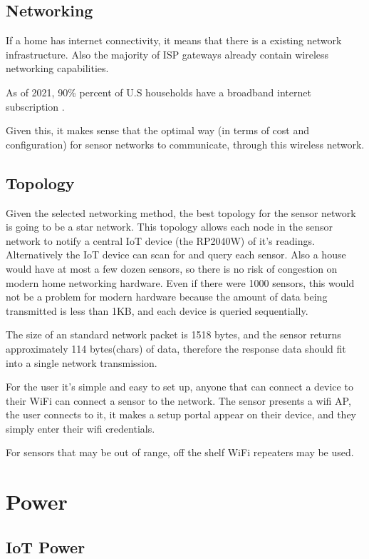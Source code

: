 \documentclass[10pt, journal]{IEEEtran} %
\begin{document}
\subsection{Networking}

If a home has internet connectivity, it means that there is a existing network infrastructure.
Also the majority of ISP gateways already contain wireless networking capabilities.

As of 2021, 90\% percent of U.S households have a broadband internet subscription \cite{censusgov}.

Given this, it makes sense that the optimal way (in terms of cost and configuration) for sensor networks to communicate,
through this wireless network.

\subsection{Topology}

Given the selected networking method, the best topology for the sensor network is going to be a star network. 
This topology allows each node in the sensor network to notify a central IoT device (the RP2040W) of it's readings.
Alternatively the IoT device can scan for and query each sensor.
Also a house would have at most a few dozen sensors, so there is no risk of congestion on modern home networking hardware.
Even if there were 1000 sensors, this would not be a problem for modern hardware because the amount of data being transmitted is less than 1KB,
and each device is queried sequentially.

The size of an standard network packet is 1518 bytes, 
and the sensor returns approximately 114 bytes(chars) of data,
therefore the response data should fit into a single network transmission.

For the user it's simple and easy to set up, anyone that can connect a device to their WiFi can connect a sensor to the network.
The sensor presents a wifi AP, 
the user connects to it, 
it makes a setup portal appear on their device, 
and they simply enter their wifi credentials.

For sensors that may be out of range,
off the shelf WiFi repeaters may be used.

\section{Power}

\subsection{IoT Power}
\end{document}
